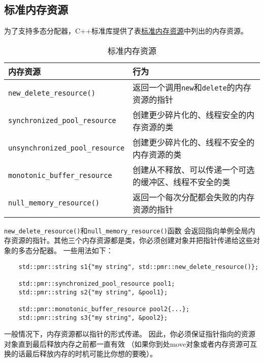 \subsection{标准内存资源}
为了支持多态分配器，C++标准库提供了表\hyperref[t29.1]{标准内存资源}中列出的内存资源。
\begin{table}[htb]
    \centering
    \begin{tabular}{l|l}
        \hline
        \textbf{内存资源}                           & \textbf{行为}                                \\
        \hline
        \texttt{new\_delete\_resource()}        & 返回一个调用\texttt{new}和\texttt{delete}的内存资源的指针 \\
        \texttt{synchronized\_pool\_resource}   & 创建更少碎片化的、线程安全的内存资源的类                       \\
        \texttt{unsynchronized\_pool\_resource} & 创建更少碎片化的、线程不安全的内存资源的类                      \\
        \texttt{monotonic\_buffer\_resource}    & 创建从不释放、可以传递一个可选的缓冲区、线程不安全的类                \\
        \texttt{null\_memory\_resource()}       & 返回一个每次分配都会失败的内存资源的指针                       \\
        \hline
    \end{tabular}
    \caption{标准内存资源}
    \label{t29.1}
\end{table}

\texttt{new\_delete\_resource()}和\texttt{null\_memory\_resource()}函数
会返回指向单例全局内存资源的指针。其他三个内存资源都是类，你必须创建对象并把指针传递给这些对象的多态分配器。
一些用法如下：
\begin{lstlisting}
    std::pmr::string s1{"my string", std::pmr::new_delete_resource()};

    std::pmr::synchronized_pool_resource pool1;
    std::pmr::string s2{"my string", &pool1};

    std::pmr::monotonic_buffer_resource pool2{...};
    std::pmr::string s3{"my string", &pool2};
\end{lstlisting}
一般情况下，内存资源都以指针的形式传递。
因此，你必须保证指针指向的资源对象直到最后释放内存之前都一直有效
（如果你到处move对象或者内存资源可互换的话最后释放内存的时机可能比你想的要晚）。

